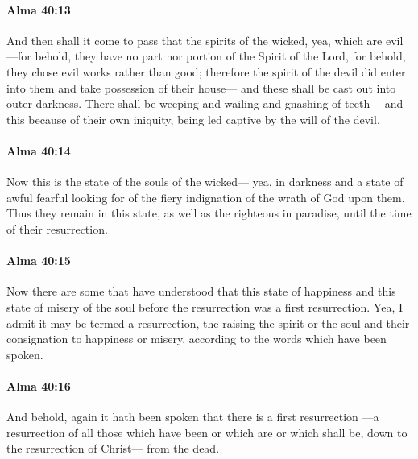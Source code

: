 		\paragraph{Alma 40:13} %
			\label{ALMA-40-13}

			And then shall it come to pass that
			the spirits of the wicked, yea, which are evil
			---for behold, they have no part nor portion of the Spirit of the Lord,
			for behold, they chose evil works rather than good;
			therefore the spirit of the devil did enter into them
			and take possession of their house---
			and these shall be cast out into outer darkness.
			There shall be weeping and wailing and gnashing of teeth---
			and this because of their own iniquity,
			being led captive by the will of the devil.

		\paragraph{Alma 40:14} %
			\label{ALMA-40-14}

			Now this is the state of the souls of the wicked---
			yea, in darkness and a state of awful fearful looking for
			of the fiery indignation of the wrath of God upon them.
			Thus they remain in this state,
			as well as the righteous in paradise,
			until the time of their resurrection.

		\paragraph{Alma 40:15} %
			\label{ALMA-40-15}

			Now there are some that have understood
			that this state of happiness
			and this state of misery of the soul before the resurrection
			was a first resurrection.
			Yea, I admit it may be termed a resurrection,
			the raising the spirit or the soul and their consignation to happiness or misery,
			according to the words which have been spoken.

		\paragraph{Alma 40:16} %
			\label{ALMA-40-16}

			And behold, again it hath been spoken that there is a first resurrection
			---a resurrection of all those which have been or which are or which shall be,
			down to the resurrection of Christ---
			from the dead.

